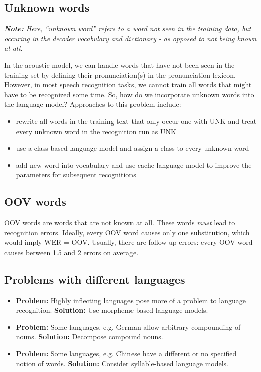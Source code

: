 \subsection{Unknown words}

\vspace{5pt}
\textit{\textbf{Note:} Here, ``unknown word'' refers to a word not seen in the training data, but occuring in the decoder vocabulary and dictionary - as opposed to not being known at all.}
\vspace{10pt}

In the acoustic model, we can handle words that have not been seen in the training set by defining their pronunciation(s) in the pronunciation lexicon. However, in most speech recognition tasks, we cannot train all words that might have to be recognized some time. So, how do we incorporate unknown words into the language model? 
Approaches to this problem include:
\begin{itemize}
    \item rewrite all words in the training text that only occur one with UNK and treat every unknown word in the recognition run as UNK
    \item use a class-based language model and assign a class to every unknown word
    \item add new word into vocabulary and use cache language model to improve the parameters for subsequent recognitions
\end{itemize}

\subsection{OOV words}
OOV words are words that are not known at all. These words \textit{must} lead to recognition errors. Ideally, every OOV word causes only one substitution, which would imply WER = OOV. Usually, there are follow-up errors: every OOV word causes between 1.5 and 2 errors on average.

\subsection{Problems with different languages}
\begin{itemize}
    \item \textbf{Problem:} Highly inflecting languages pose more of a problem to language recognition. \textbf{Solution:} Use morpheme-based language models.
    \item \textbf{Problem:} Some languages, e.g. German allow arbitrary compounding of nouns. \textbf{Solution:} Decompose compound nouns.
    \item \textbf{Problem:} Some languages, e.g. Chinese have a different or no specified notion of words. \textbf{Solution:} Consider syllable-based language models.
\end{itemize}

